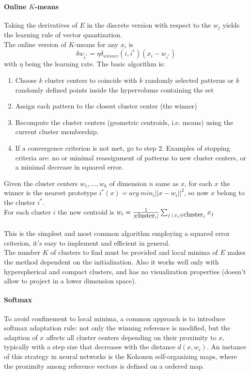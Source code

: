 \documentclass[10pt]{report}
\begin{document}
\paragraph{Online $K$-means} Taking the derivatives of $E$ in the discrete version with respect to the $w_j$ yields the learning rule of vector quantization.\\
The online version of $K$-means for any $x_i$ is $$\delta w_{i^*} = \eta\delta_{winner}(i,i^*)(x_i-w_{i^*})$$
with $\eta$ being the learning rate. The basic algorithm is:
\begin{enumerate}
	\item Choose $k$ cluster centers to coincide with $k$ randomly selected patterns or $k$ randomly defined points inside the hypervolume containing the set
	\item Assign each pattern to the closest cluster center (the winner)
	\item Recompute the cluster centers (geometric centroids, i.e. means) using the current cluster membership.
	\item If a convergence criterion is not met, go to step 2. Examples of stopping criteria are: no or minimal reassignment of patterns to new cluster centers, or a minimal decrease in squared error.
\end{enumerate}
Given the cluster centers $w_1,\ldots,w_k$ of dimension $n$ same as $x$, for each $x$ the winner is the nearest prototype $i^*(x) = arg\:min_i||x-w_i||^2$, so now $x$ belong to the cluster $i^*$.\\
For each cluster $i$ the new centroid is $w_i=\frac{1}{|\hbox{cluster}_i|}\sum_{j\:|\:x_j\in\hbox{cluster}_j}x_j$\\\\
This is the simplest and most common algorithm employing a squared error criterion, it's easy to implement and efficient in general.\\
The number $K$ of clusters to find must be provided and local minima of $E$ makes the method dependent on the initialization. Also it works well only with hyperspherical and compact clusters, and has no visualization properties (doesn't allow to project in a lower dimension space).
\paragraph{Softmax} To avoid confinement to local minima, a common approach is to introduce softmax adaptation rule: not only the winning reference is modified, but the adaption of $x$ affects all cluster centers depending on their proximity to $x$, typically with a step size that decreases with the distance $d(x,w_i)$. An instance of this strategy in neural networks is the Kohonen self-organizing maps, where the proximity among reference vectors is defined on a ordered map.
\end{document}
